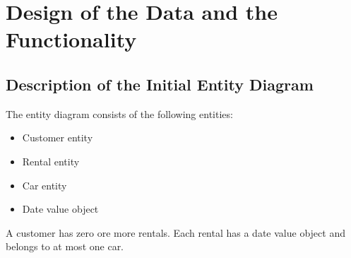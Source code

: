 \label{cha:design_of_data_and_functionality}

\section{Design of the Data and the Functionality}

\subsection*{Description of the Initial Entity Diagram}
The entity diagram consists of the following entities:
\begin{itemize}
    \item Customer entity
    \item Rental entity
    \item Car entity
    \item Date value object
\end{itemize}
A customer has zero ore more rentals.
Each rental has a date value object and belongs to at most one car.

